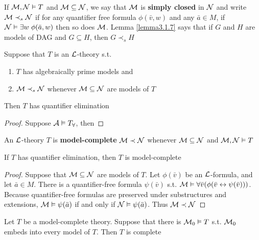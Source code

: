 \documentclass[11pt]{article}
\begin{document}
If \(\mathcal{M},\mathcal{N}\vDash T\) and \(\mathcal{M}\subseteq\mathcal{N}\), we say that
\(\mathcal{M}\) is \textbf{simply closed} in \(\mathcal{N}\) and write \(\mathcal{M}\prec_s\mathcal{N}\) if
for any quantifier free formula \(\phi(\bar{v},w)\) and any \(\bar{a}\in M\),
if \(\mathcal{N}\vDash\exists w\;\phi(\bar{a},w)\) then so does \(\mathcal{M}\). Lemma
\ref{lemma3.1.7} says that if \(G\) and \(H\) are models of DAG and
\(G\subseteq H\), then \(G\prec_s H\)

\begin{corollary}[]
\label{cor3.1.12}
Suppose that \(T\) is an \(\mathcal{L}\)-theory s.t.
\begin{enumerate}
\item \(T\) has algebraically prime models and
\item \(\mathcal{M}\prec_s\mathcal{N}\) whenever \(\mathcal{M}\subseteq\mathcal{N}\) are models of
\(T\)
\end{enumerate}


Then \(T\) has quantifier elimination
\end{corollary}

\begin{proof}
Suppose \(\mathcal{A}\vDash T_\forall\), then 
\end{proof}


\begin{definition}[]
An \(\mathcal{L}\)-theory \(T\) is \textbf{model-complete} \(\mathcal{M}\prec\mathcal{N}\) whenever
\(\mathcal{M}\subseteq\mathcal{N}\) and \(\mathcal{M},\mathcal{N}\vDash T\)
\end{definition}

\begin{proposition}[]
If \(T\) has quantifier elimination, then \(T\) is model-complete
\end{proposition}

\begin{proof}
Suppose that \(\mathcal{M}\subseteq\mathcal{N}\) are models of \(T\). Let \(\phi(\bar{v})\)
be an \(\mathcal{L}\)-formula, and let \(\bar{a}\in M\). There is a quantifier-free
formula \(\psi(\bar{v})\) s.t. \(\mathcal{M}\vDash\forall\bar{v}(\phi(\bar{v}\leftrightarrow\psi(\bar{v})))\).
Because quantifier-free formulas are preserved under substructures and
extensions, \(\mathcal{M}\vDash\psi(\bar{a})\) if and only if
\(\mathcal{N}\vDash\psi(\bar{a})\). Thus \(\mathcal{M}\prec\mathcal{N}\)
\end{proof}

\begin{proposition}[]
\label{prop3.1.15}
Let \(T\) be a model-complete theory. Suppose that there is
\(\mathcal{M}_0\vDash T\) s.t. \(\mathcal{M}_0\) embeds into every model of \(T\). Then
\(T\) is complete
\end{proposition}
\end{document}
